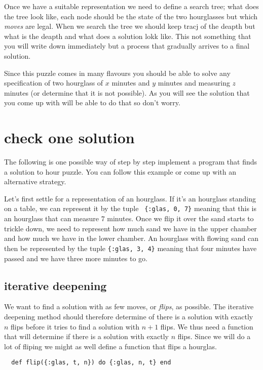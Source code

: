 \documentclass[a4paper,11pt]{article}
\begin{document}
Once we have a suitable representation we need to define a search
tree; what does the tree look like, each node should be the state of
the two hourglasses but which {\em moves} are legal. When we search
the tree we should keep tracj of the deapth but what is the deapth and
what does a solution lokk like. This not something that you will write
down immediately but a process that gradually arrives to a final
solution.

Since this puzzle comes in many flavours you should be able to solve
any specification of two hourglass of $x$ minutes and $y$ minutes and
measuring $z$ minutes (or determine that it is not possible). As you
will see the solution that you come up with will be able to do that so
don't worry.

\section*{check one solution}

The following is one possible way of step by step implement a program
that finds a solution to hour puzzle. You can follow this example or
come up with an alternative strategy.

Let's first settle for a representation of an hourglass. If it's an
hourglass standing on a table, we can represent it by the tuple {\tt
  \{:glas, 0, 7\}} meaning that this is an hourglass that can measure $7$
minutes. Once we flip it over the sand starts to trickle down, we need
to represent how much sand we have in the upper chamber and how much
we have in the lower chamber. An hourglass with flowing sand can then
be represented by the tuple {\tt \{:glas, 3, 4\}} meaning that four
minutes have passed and we have three more minutes to go.

\subsection{iterative deepening}

We want to find a solution with as few moves, or {\em flips}, as
possible. The iterative deepening method should therefore determine of
there is a solution with exactly $n$ flips before it tries to find a
solution with $n+1$ flips. We thus need a function that will determine
if there is a solution with exactly $n$ flips. Since we will do a lot
of fliping we might as well define a function that flips a hourglas.

\begin{verbatim}
  def flip({:glas, t, n}) do {:glas, n, t} end  
\end{verbatim}
\end{document}

